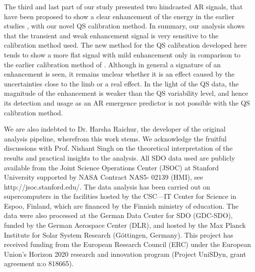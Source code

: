 \documentclass{aa}
\begin{document}
The third and last part of our study presented two hindcasted 
AR \fff signals, that have been proposed to show a clear enhancement of the \fff energy in the earlier studies \citep[][]{SRB16,Waidele22}, with our novel QS calibration method. In summary, our analysis shows that the transient
and weak enhancement signal is very sensitive to the calibration
method used. The new method for the QS calibration developed here tends to show a more flat signal with mild enhancement only in comparison to the earlier calibration method of \cite{SRB16}. Although in general a signature of an enhancement is seen, it remains unclear whether it is an effect caused by the uncertainties close to the limb or a real effect. In the light of the QS data, the magnitude of the enhancement is weaker than the QS variability level, and hence its detection and usage as an AR emergence predictor is not possible with the QS calibration method.

\begin{acknowledgements}
We are also indebted to Dr. Harsha Raichur, the developer of the original \fff analysis pipeline, wherefrom this work stems. We acknowledge the fruitful discussions with Prof. Nishant Singh on the theoretical interpretation of the results and practical insights to the analysis.
All SDO data used are publicly available from the Joint Science Operations Center (JSOC) at Stanford University supported by NASA Contract NAS5- 02139 (HMI), see http://jsoc.stanford.edu/. 
The data analysis has been carried out on supercomputers in the facilities hosted by the CSC---IT
Center for Science in Espoo, Finland, which are financed by the
Finnish ministry of education.
The data were also
processed at the German Data Center for SDO (GDC-SDO), funded by the
German Aerospace Center (DLR), and hosted by the Max Planck Institute for Solar System Research (Göttingen, Germany).
This project has received funding from the European Research Council (ERC)
under the European Union's Horizon 2020 research and innovation
program (Project UniSDyn, grant agreement n:o 818665).

\end{acknowledgements}

{}

\end{document}
